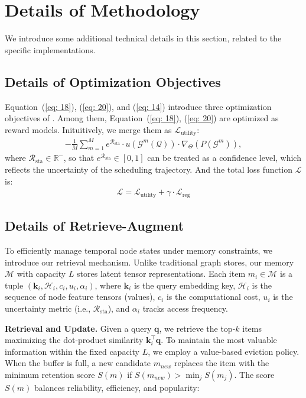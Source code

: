 \appendix

\clearpage
\section{Details of Methodology}
We introduce some additional technical details in this section, related to the specific implementations.
\subsection{Details of Optimization Objectives}
\label{app: loss}

Equation~(\ref{eq: 18}), (\ref{eq: 20}), and (\ref{eq: 14}) introduce three optimization objectives of \ourmethod. Among them, Equation~(\ref{eq: 18}), (\ref{eq: 20}) are optimized as reward models. Inituitively, we merge them as $\mathcal{L}_{\text{utility}}$:
\begin{gather}
    -\frac{1}{M} \sum_{m=1}^M e^{\mathcal{R}_{\text{sta}}}\cdot u(\mathcal{G}^m(\mathcal{Q}))\cdot \nabla_\Theta({P(\mathcal{G}^m)}),
\end{gather}
where $\mathcal{R}_{\text{sta}} \in \mathbb{R}^-$, so that $e^{\mathcal{R}_{\text{sta}}} \in [0,1]$ can be treated as a confidence level, which reflects the uncertainty of the scheduling trajectory. And the total loss function $\mathcal{L}$ is:
\begin{gather}
    \mathcal{L} = \mathcal{L}_{\text{utility}} + \gamma \cdot \mathcal{L}_{\text{reg}}
\end{gather}


\subsection{Details of Retrieve-Augment}
\label{app: rag}

To efficiently manage temporal node states under memory constraints, we introduce our retrieval mechanism. Unlike traditional graph stores, our memory $\mathcal{M}$ with capacity $L$ stores latent tensor representations. Each item $m_i \in \mathcal{M}$ is a tuple $(\mathbf{k}_i, \mathcal{H}_i, c_i, u_i, \alpha_i)$, where $\mathbf{k}_i$ is the query embedding key, $\mathcal{H}_i$ is the sequence of node feature tensors (values), $c_i$ is the computational cost, $u_i$ is the uncertainty metric (i.e., $\mathcal{R}_{\text{sta}}$), and $\alpha_i$ tracks access frequency.

\textbf{Retrieval and Update.} 
Given a query $\mathbf{q}$, we retrieve the top-$k$ items maximizing the dot-product similarity $\mathbf{k}_i^\top \mathbf{q}$. To maintain the most valuable information within the fixed capacity $L$, we employ a value-based eviction policy. When the buffer is full, a new candidate $m_{new}$ replaces the item with the minimum retention score $S(m)$ if $S(m_{new}) > \min_{j} S(m_j)$. The score $S(m)$ balances reliability, efficiency, and popularity:

